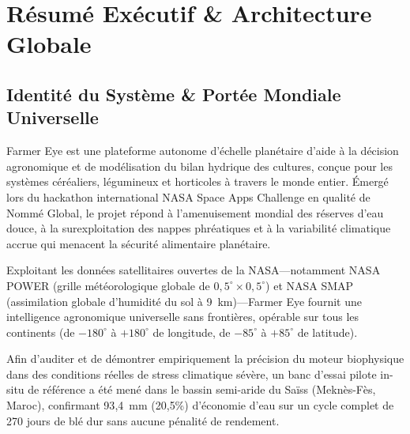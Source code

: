 \documentclass[11pt,a4paper,oneside]{report}
\begin{document}
\tableofcontents
\newpage

\chapter{Résumé Exécutif \& Architecture Globale}

\section{Identité du Système \& Portée Mondiale Universelle}
Farmer Eye est une plateforme autonome d'échelle planétaire d'aide à la décision agronomique et de modélisation du bilan hydrique des cultures, conçue pour les systèmes céréaliers, légumineux et horticoles à travers le monde entier. Émergé lors du hackathon international NASA Space Apps Challenge en qualité de Nommé Global, le projet répond à l'amenuisement mondial des réserves d'eau douce, à la surexploitation des nappes phréatiques et à la variabilité climatique accrue qui menacent la sécurité alimentaire planétaire.

Exploitant les données satellitaires ouvertes de la NASA—notamment NASA POWER (grille météorologique globale de $0{,}5^\circ \times 0{,}5^\circ$) et NASA SMAP (assimilation globale d'humidité du sol à 9~km)—Farmer Eye fournit une intelligence agronomique universelle sans frontières, opérable sur tous les continents (de $-180^\circ$ à $+180^\circ$ de longitude, de $-85^\circ$ à $+85^\circ$ de latitude).

Afin d'auditer et de démontrer empiriquement la précision du moteur biophysique dans des conditions réelles de stress climatique sévère, un banc d'essai pilote in-situ de référence a été mené dans le bassin semi-aride du Saïss (Meknès-Fès, Maroc), confirmant 93{,}4~mm (20{,}5\%) d'économie d'eau sur un cycle complet de 270 jours de blé dur sans aucune pénalité de rendement.
\end{document}
